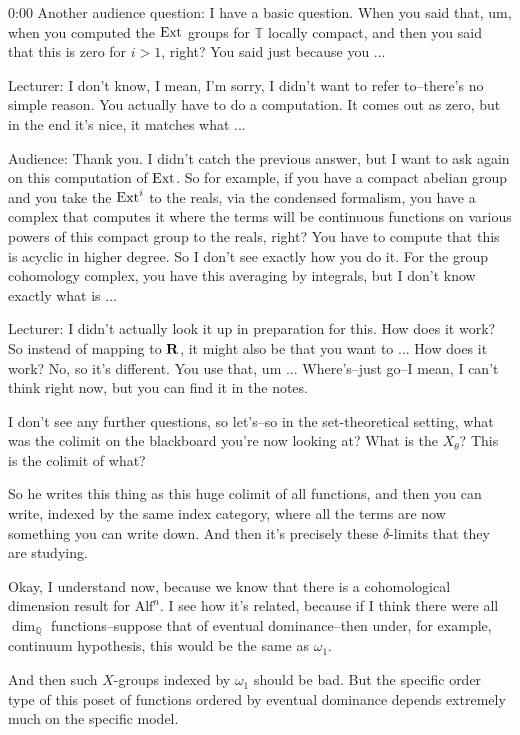 \begin{unfinished}{0:00}
Another audience question: I have a basic question. When you said that, um, when you computed the $\operatorname{Ext}$ groups for $\mathbb{T}$ locally compact, and then you said that this is zero for $i > 1$, right? You said just because you ...

Lecturer: I don't know, I mean, I'm sorry, I didn't want to refer to--there's no simple reason. You actually have to do a computation. It comes out as zero, but in the end it's nice, it matches what ...

Audience: Thank you. I didn't catch the previous answer, but I want to ask again on this computation of $\operatorname{Ext}$. So for example, if you have a compact abelian group and you take the $\operatorname{Ext}^i$ to the reals, via the condensed formalism, you have a complex that computes it where the terms will be continuous functions on various powers of this compact group to the reals, right? You have to compute that this is acyclic in higher degree. So I don't see exactly how you do it. For the group cohomology complex, you have this averaging by integrals, but I don't know exactly what is ...

Lecturer: I didn't actually look it up in preparation for this. How does it work? So instead of mapping to $\mathbf R$, it might also be that you want to ... How does it work? No, so it's different. You use that, um ...
Where's--just go--I mean, I can't think right now, but you can find it in the notes.

I don't see any further questions, so let's--so in the set-theoretical setting, what was the colimit on the blackboard you're now looking at? What is the $X_\theta$? This is the colimit of what?

So he writes this thing as this huge colimit of all functions, and then you can write, indexed by the same index category, where all the terms are now something you can write down. And then it's precisely these $\delta$-limits that they are studying.

Okay, I understand now, because we know that there is a cohomological dimension result for $\mathrm{Alf}^n$. I see how it's related, because if I think there were all $\dim_\mathbb{Q}$ functions--suppose that of eventual dominance--then under, for example, continuum hypothesis, this would be the same as $\omega_1$.

And then such $X$-groups indexed by $\omega_1$ should be bad. But the specific order type of this poset of functions ordered by eventual dominance depends extremely much on the specific model.

\end{unfinished}